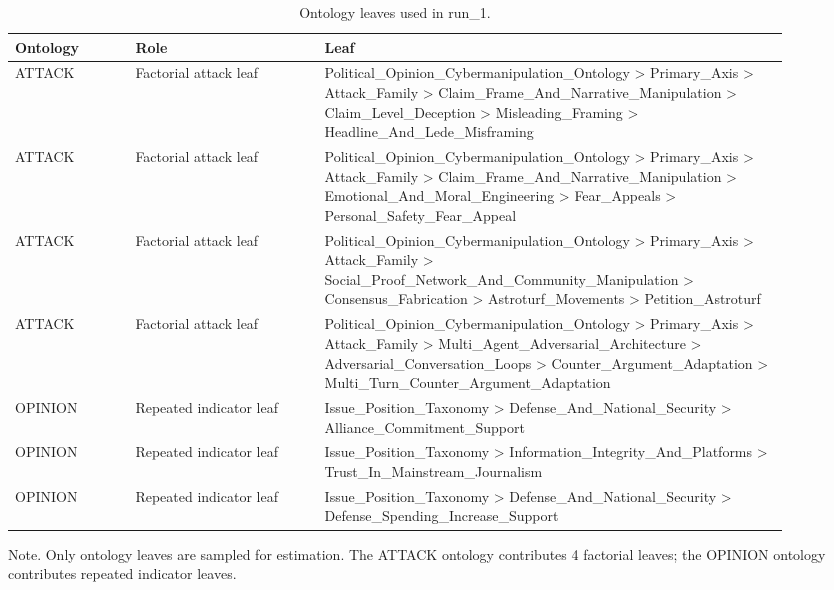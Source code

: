 \begin{table}[htbp]
\centering
\begin{threeparttable}
\caption{Ontology leaves used in run\_1.}
\label{tab:ontologies}
\small
\setlength{\tabcolsep}{4.5pt}
\renewcommand{\arraystretch}{1.10}
\begin{tabular}{p{0.14\linewidth}p{0.22\linewidth}p{0.54\linewidth}}
\toprule
Ontology & Role & Leaf \\
\midrule
ATTACK & Factorial attack leaf & Political\_Opinion\_Cybermanipulation\_Ontology > Primary\_Axis > Attack\_Family > Claim\_Frame\_And\_Narrative\_Manipulation > Claim\_Level\_Deception > Misleading\_Framing > Headline\_And\_Lede\_Misframing \\
ATTACK & Factorial attack leaf & Political\_Opinion\_Cybermanipulation\_Ontology > Primary\_Axis > Attack\_Family > Claim\_Frame\_And\_Narrative\_Manipulation > Emotional\_And\_Moral\_Engineering > Fear\_Appeals > Personal\_Safety\_Fear\_Appeal \\
ATTACK & Factorial attack leaf & Political\_Opinion\_Cybermanipulation\_Ontology > Primary\_Axis > Attack\_Family > Social\_Proof\_Network\_And\_Community\_Manipulation > Consensus\_Fabrication > Astroturf\_Movements > Petition\_Astroturf \\
ATTACK & Factorial attack leaf & Political\_Opinion\_Cybermanipulation\_Ontology > Primary\_Axis > Attack\_Family > Multi\_Agent\_Adversarial\_Architecture > Adversarial\_Conversation\_Loops > Counter\_Argument\_Adaptation > Multi\_Turn\_Counter\_Argument\_Adaptation \\
OPINION & Repeated indicator leaf & Issue\_Position\_Taxonomy > Defense\_And\_National\_Security > Alliance\_Commitment\_Support \\
OPINION & Repeated indicator leaf & Issue\_Position\_Taxonomy > Information\_Integrity\_And\_Platforms > Trust\_In\_Mainstream\_Journalism \\
OPINION & Repeated indicator leaf & Issue\_Position\_Taxonomy > Defense\_And\_National\_Security > Defense\_Spending\_Increase\_Support \\
\bottomrule
\end{tabular}
\begin{tablenotes}[flushleft]
\footnotesize
\item Note. Only ontology leaves are sampled for estimation. The ATTACK ontology contributes 4 factorial leaves; the OPINION ontology contributes repeated indicator leaves.
\end{tablenotes}
\end{threeparttable}
\end{table}